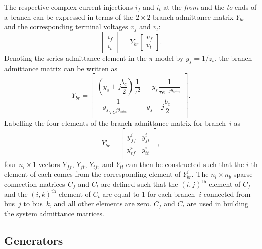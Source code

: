 \documentclass[12pt]{article}
\numberwithin{equation}{section}
\numberwithin{table}{section}
\numberwithin{figure}{section}
\begin{document}
The respective complex current injections $i_f$ and $i_t$ at the \emph{from} and the \emph{to} ends of a branch
can be expressed in terms of the $2 \times 2$ branch admittance matrix $Y_{br}$
and the corresponding terminal voltages $v_f$ and $v_t$:
\begin{equation}
  \begin{bmatrix} i_f \\ i_t \end{bmatrix}
  = Y_{br}
  \begin{bmatrix} v_f \\ v_t \end{bmatrix}.
  \label{eq:if_it}
\end{equation}
Denoting the series admittance element in the $\pi$ model by $y_s = 1 / z_s$,
the branch admittance matrix can be written as
\begin{equation}
Y_{br} =
\begin{bmatrix}
  \\[-1em]
  \left(y_s + j \dfrac{b_c}{2}\right) \dfrac{1}{\tau^2}
  &
  -y_s \dfrac{1}{\tau e^{-j\theta_\mathrm{shift}}}
  \\
  -y_s \dfrac{1}{\tau e^{ j\theta_\mathrm{shift}}}
  &
  y_s + j \dfrac{b_c}{2}
  \\[0.7em]
\end{bmatrix}.
\label{eq:Ybr}
\end{equation}
% 
Labelling the four elements of the branch admittance matrix for branch~$i$ as
\begin{equation}
  Y_{br}^i = 
  \begin{bmatrix}
    \\[-1.1em]
    y_{f\!f}^i & y_{ft}^i \\
    y_{t\!f}^i & y_{tt}^i
    \\[0.2em] 
  \end{bmatrix},
\label{eq:Ybri}
\end{equation}
four $n_l \times 1$ vectors $Y_{f\!f}$, $Y_{ft}$, $Y_{t\!f}$, and $Y_{tt}$ can then be constructed
such that the $i$-th element of each comes from the corresponding element of $Y_{br}^i$.
The $n_l \times n_b$ sparse connection matrices $C_f$ and $C_t$ are defined such that
the $(i,j)^\mathrm{th}$ element of $C_f$ and the $(i,k)^\mathrm{th}$ element of $C_t$ are equal to 1
for each branch~$i$ connected from bus~$j$ to bus~$k$,
and all other elements are zero.
$C_f$ and $C_t$ are used in building the system admittance matrices.

\subsection{Generators}
\end{document}
